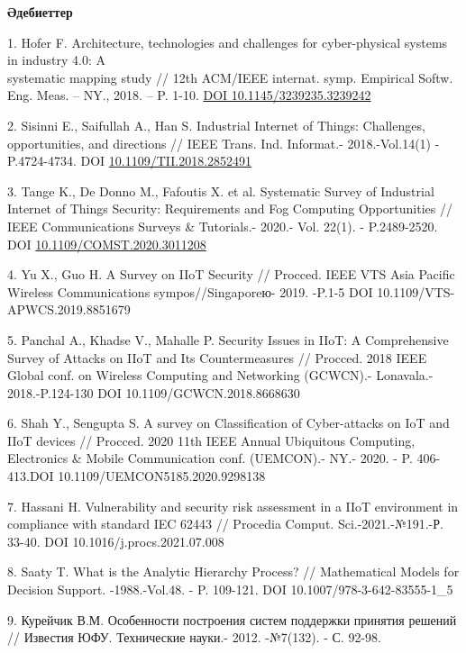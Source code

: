 \begin{center}
{\bfseries Әдебиеттер}
\end{center}

\begin{references}
1. Hofer F. Architecture, technologies and challenges for cyber-physical
systems in industry 4.0: A \\systematic mapping study // 12th ACM/IEEE
internat. symp. Empirical Softw. Eng. Meas. -- NY., 2018. -- P. 1-10.
\href{https://doi.org/10.1145/3239235.3239242}{DOI
10.1145/3239235.3239242}

2. Sisinni E., Saifullah A., Han S. Industrial Internet of Things:
Challenges, opportunities, and directions // IEEE Trans. Ind. Informat.-
2018.-Vol.14(1) - P.4724-4734. DOI \href{https://doi.org/10.1109/TII.2018.2852491}{10.1109/TII.2018.2852491}

3. Tange K., De Donno M., Fafoutis X. et al. Systematic Survey of
Industrial Internet of Things Security: Requirements and Fog Computing
Opportunities // IEEE Communications Surveys \& Tutorials.- 2020.- Vol.
22(1). - P.2489-2520. DOI
\href{http://dx.doi.org/10.1109/COMST.2020.3011208}{10.1109/COMST.2020.3011208}

4. Yu X., Guo H. A Survey on IIoT Security // Procced. IEEE VTS Asia
Pacific Wireless Communications sympos//Singaporeю- 2019. -P.1-5 DOI
10.1109/VTS-APWCS.2019.8851679

5. Panchal A., Khadse V., Mahalle P. Security Issues in IIoT: A
Comprehensive Survey of Attacks on IIoT and Its Countermeasures //
Procced. 2018 IEEE Global conf. on Wireless Computing and Networking
(GCWCN).- Lonavala.- 2018.-P.124-130 DOI 10.1109/GCWCN.2018.8668630

6. Shah Y., Sengupta S. A survey on Classification of Cyber-attacks on
IoT and IIoT devices // Procced. 2020 11th IEEE Annual Ubiquitous
Computing, Electronics \& Mobile Communication conf. (UEMCON).- NY.-
2020. - P. 406-413.DOI 10.1109/UEMCON5185.2020.9298138

7. Hassani H. Vulnerability and security risk assessment in a IIoT
environment in compliance with standard IEC 62443 // Procedia Comput.
Sci.-2021.-№191.-Р. 33-40. DOI 10.1016/j.procs.2021.07.008

8. Saaty T. What is the Analytic Hierarchy Process? // Mathematical
Models for Decision Support. -1988.-Vol.48. - P. 109-121. DOI
10.1007/978-3-642-83555-1\_5

9. Курейчик В.М. Особенности построения систем поддержки принятия
решений // Известия ЮФУ. Технические науки.- 2012. -№7(132). - С. 92-98.


\end{references}
